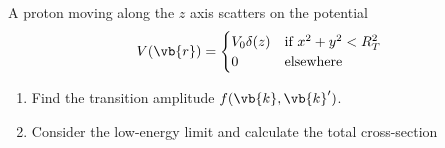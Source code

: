 \begin{esercizio}
   A proton moving along the $z$ axis scatters on the potential
   \begin{equation*}
      V(\vb{r})=
      \begin{cases}
         V_0 \delta(z) & \text{if } x^2 + y^2 < R_T^2\\
         0 & \text{elsewhere}
      \end{cases}
   \end{equation*}
   \begin{enumerate}[label=\alph*), leftmargin=0.6cm]
      \item Find the transition amplitude $f(\vb{k},\vb{k}')$.
      \item Consider the low-energy limit and calculate the total cross-section
   \end{enumerate}
\end{esercizio}
